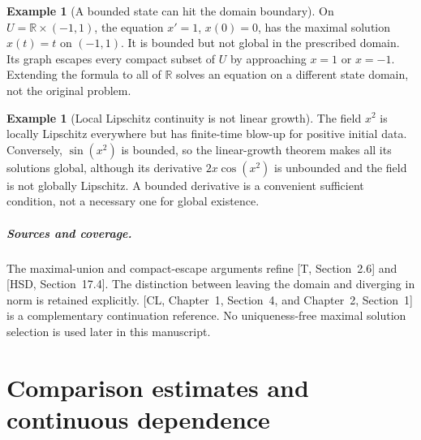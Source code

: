 \documentclass[11pt,oneside]{book}
\theoremstyle{definition}
\newtheorem{example}[theorem]{Example}
\theoremstyle{remark}\newtheorem{remark}[theorem]{Remark}
\newcommand{\R}{\mathbb R}\newcommand{\C}{\mathbb C}
\begin{document}
\begin{example}[A bounded state can hit the domain boundary]\label{d13:04:domain-boundary}
On $U=\R\times(-1,1)$, the equation $x'=1$, $x(0)=0$, has the
maximal solution $x(t)=t$ on $(-1,1)$. It is bounded but not global
in the prescribed domain. Its graph escapes every compact subset of
$U$ by approaching $x=1$ or $x=-1$. Extending the formula to all of
$\R$ solves an equation on a different state domain, not the original
problem.
\end{example}

\begin{example}[Local Lipschitz continuity is not linear growth]\label{d13:04:local-not-global}
The field $x^2$ is locally Lipschitz everywhere but has finite-time
blow-up for positive initial data. Conversely, $\sin(x^2)$ is bounded,
so the linear-growth theorem makes all its solutions global, although
its derivative $2x\cos(x^2)$ is unbounded and the field is not globally
Lipschitz. A bounded derivative is a convenient sufficient condition,
not a necessary one for global existence.
\end{example}

\paragraph{Sources and coverage.}
The maximal-union and compact-escape arguments refine [T,
Section~2.6] and [HSD, Section~17.4]. The distinction between leaving
the domain and diverging in norm is retained explicitly. [CL,
Chapter~1, Section~4, and Chapter~2, Section~1] is a complementary
continuation reference. No uniqueness-free maximal solution selection
is used later in this manuscript.



\chapter{Comparison estimates and continuous dependence}\label{ch:d13-05}
\end{document}
